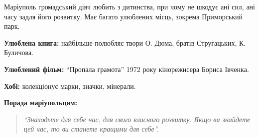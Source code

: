 Маріуполь громадський діяч любить з дитинства, при чому не шкодує ані сил, ані
часу задля його розвитку. Має багато улюблених місць, зокрема Приморський парк.


\textbf{Улюблена книга:} найбільше полюбляє твори О. Дюма, братів Стругацьких, К. Буличова.

\textbf{Улюблений фільм:} \enquote{Пропала грамота} 1972 року кінорежисера Бориса Івченка.

\textbf{Хобі:} колекціонує марки, значки, мінерали.

\textbf{Порада маріупольцям:} 

\begin{quote}
\em\enquote{Знаходьте для себе час, для свого власного розвитку. Якщо ви знайдете
цей час, то ви станете кращими для себе}. 
\end{quote}

